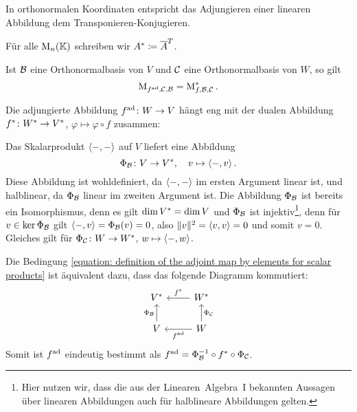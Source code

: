 In orthonormalen Koordinaten entspricht das Adjungieren einer linearen Abbildung dem Transponieren-Konjugieren.

\begin{notation}
  Für alle $\operatorname{M}_{n}(\mathbb{K})$ schreiben wir $A^* \coloneqq \overline{A}^T$.
\end{notation}

\begin{lemma}
  Ist $\mathcal{B}$ eine Orthonormalbasis von $V$ und $\mathcal{C}$ eine Orthonormalbasis von $W$, so gilt
  \[
      \operatorname{M}_{f^{\operatorname{ad}}, \mathcal{C}, \mathcal{B}}
    = \operatorname{M}_{f, \mathcal{B}, \mathcal{C}} ^*.
  \]
\end{lemma}

Die adjungierte Abbildung $f^{\operatorname{ad}} \colon W \to V$ hängt eng mit der dualen Abbildung $f^* \colon W^* \to V^*$, $\varphi \mapsto \varphi \circ f$ zusammen:

Das Skalarprodukt $\left\langle -, - \right\rangle$ auf $V$ liefert eine Abbildung
\[
          \Phi_{\mathcal{B}}
  \colon  V
  \to     V^*,
  \quad   v
  \mapsto \left\langle -, v \right\rangle.
\]
Diese Abbildung ist wohldefiniert, da $\left\langle -, - \right\rangle$ im ersten Argument linear ist, und halblinear, da $\Phi_{\mathcal{B}}$ linear im zweiten Argument ist.
Die Abbildung $\Phi_{\mathcal{B}}$ ist bereits ein Isomorphismus, denn es gilt $\dim V^* = \dim V$ und $\Phi_{\mathcal{B}}$ ist injektiv\footnote{Hier nutzen wir, dass die aus der Linearen~Algebra~I bekannten Aussagen über linearen Abbildungen auch für halblineare Abbildungen gelten.}, denn für $v \in \ker \Phi_{\mathcal{B}}$ gilt $\left\langle -, v \right\rangle = \Phi_{\mathcal{B}}(v) = 0$, also $\|v\|^2 = \left\langle v, v \right\rangle = 0$ und somit $v = 0$.
Gleiches gilt für $\Phi_{\mathcal{C}} \colon W \to W^*$, $w \mapsto \left\langle -, w \right\rangle$.

Die Bedingung \eqref{equation: definition of the adjoint map by elements for scalar products} ist äquivalent dazu, dass das folgende Diagramm kommutiert:
\[
  \begin{tikzcd}
      V^*
    & W^*
      \arrow[swap]{l}{\dual{f}}
    \\
      V
      \arrow{u}{\Phi_{\basis{B}}}
    & W
      \arrow[swap]{u}{\Phi_{\basis{C}}}
      \arrow{l}{\adj{f}}
  \end{tikzcd}
\]
Somit ist $f^{\operatorname{ad}}$ eindeutig bestimmt als $f^{\operatorname{ad}} = \Phi_{\mathcal{B}}^{-1} \circ f^* \circ \Phi_{\mathcal{C}}$.

























